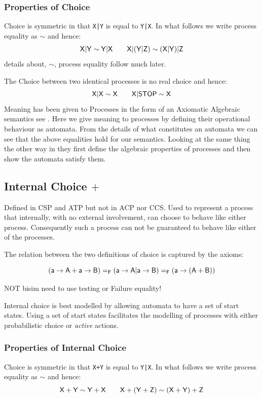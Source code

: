 \documentclass[]{article}
\begin{document}
\subsubsection{Properties of Choice}
 Choice is symmetric in that \verb$X|Y$ is equal to \verb$Y|X$. In what follows we write process equality as $\sim$ and hence:
 \[\sf X|Y\sim Y|X\qquad X|(Y|Z)\sim (X|Y)|Z\]
 details about, $\sim$,  process equality follow much later. 

The Choice between two identical processes is no real choice and hence:
\[\sf X|X\sim X\qquad X|STOP \sim X\]
Meaning has been  given to Processes in the form of an Axiomatic Algebraic semantics see \cite{BaW90}. Here we give meaning to processes by defining their operational behaviour as automata. From the details of what constitutes an automata we can see that the above equalities hold for our semantics. Looking at the same thing the other way in \cite{BaW90} they first define the algebraic properties of processes and then show the automata satisfy them.

{
\subsection{Internal  Choice $+$}
Defined in CSP and ATP but not in ACP nor CCS.
Used to represent a process that internally, with no external involvement, can choose to behave like either process. Consequently such a process can not be guaranteed to behave like either of the processes.

The relation between the two definitions of choice is captured by the axioms:


\[\sf (a->A+a->B) =_F (a->A|a->B) =_F (a->(A+B))\]

{\color{red} NOT bisim need to use testing or Failure equality!}

Internal choice is best modelled by allowing automata to have a set of start states. Using a set of start states  facilitates the modelling of processes  with either  probabilistic choice or  \emph{active} actions.

\subsubsection{Properties of Internal Choice}
 Choice is symmetric in that \verb$X+Y$ is equal to \verb$Y|X$. In what follows we write process equality as $\sim$ and hence:
 \[\sf X+Y\sim Y+X \qquad X+(Y+Z)\sim (X+Y)+Z\]
 
 

}
\end{document}
